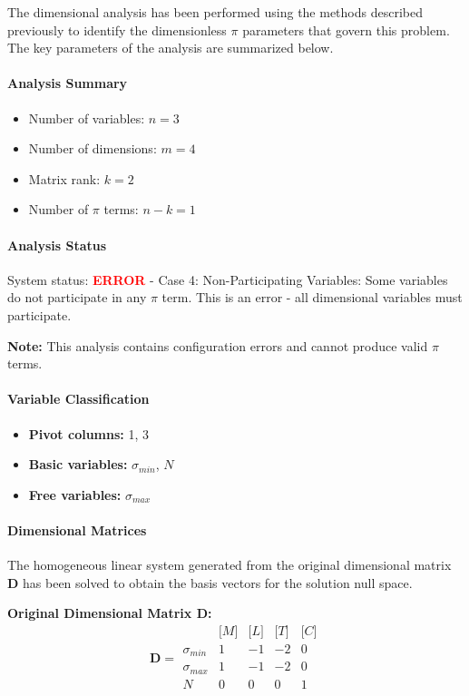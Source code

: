 The dimensional analysis has been performed using the methods described previously to identify the dimensionless $\pi$ parameters that govern this problem. The key parameters of the analysis are summarized below.

\paragraph{Analysis Summary}
\begin{itemize}
\item Number of variables: $n = 3$
\item Number of dimensions: $m = 4$
\item Matrix rank: $k = 2$
\item Number of $\pi$ terms: $n - k = 1$
\end{itemize}

\paragraph{Analysis Status}
System status: \textcolor{red}{\textbf{ERROR}} - Case 4: Non-Participating Variables: Some variables do not participate in any $\pi$ term. This is an error - all dimensional variables must participate.

\textbf{Note:} This analysis contains configuration errors and cannot produce valid $\pi$ terms.


\paragraph{Variable Classification}
\begin{itemize}
\item \textbf{Pivot columns:} 1, 3
\item \textbf{Basic variables:} $\sigma_{min}$, $N$
\item \textbf{Free variables:} $\sigma_{max}$
\end{itemize}

                \paragraph{Dimensional Matrices}
                The homogeneous linear system generated from the original dimensional matrix $\mathbf{D}$ has been solved to obtain the basis vectors for the solution null space.

                \textbf{Original Dimensional Matrix $\mathbf{D}$:}
                \[\mathbf{D} = \begin{array}{r|rrrr}
                & \text{[}M\text{]} & \text{[}L\text{]} & \text{[}T\text{]} & \text{[}C\text{]} \\
                \hline
                \sigma_{min} & 1 & -1 & -2 & 0 \\
\sigma_{max} & 1 & -1 & -2 & 0 \\
N & 0 & 0 & 0 & 1 \\

                \end{array}\]


